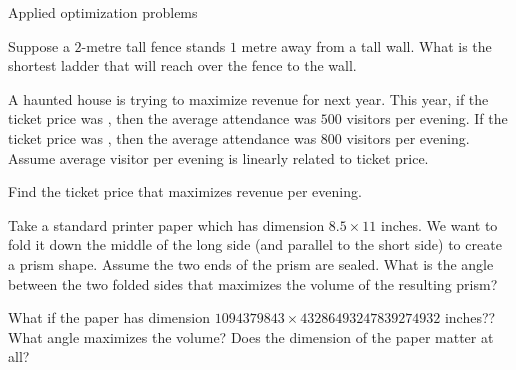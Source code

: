 \documentclass[../main.tex]{subfiles}
\begin{document}
\begin{lesson}{Applied optimization problems}
  \clearpage

  \begin{example} \label{ex:optimization-ladder}
    Suppose a \(2\)-metre tall fence stands \(1\) metre away from a tall wall.  What is the shortest ladder that will reach over the fence to the wall.
  \end{example}

  \begin{example}
    A haunted house is trying to maximize revenue for next year. This year, if the ticket price was , then the average attendance was \(500\) visitors per evening. If the ticket price was , then the average attendance was \(800\) visitors per evening.  Assume average visitor per evening is linearly related to ticket price.

    Find the ticket price that maximizes revenue per evening. 
  \end{example}

  \begin{example}
    Take a standard printer paper which has dimension \(8.5 \times 11\) inches. We want to fold it down the middle of the long side (and parallel to the short side) to create a prism shape. Assume the two ends of the prism are sealed. What is the angle between the two folded sides that maximizes the volume of the resulting prism?


    \faComment{} What if the paper has dimension \(1094379843 \times 43286493247839274932\) inches?? What angle maximizes the volume? Does the dimension of the paper matter at all?
  \end{example}
\end{lesson}
\end{document}
